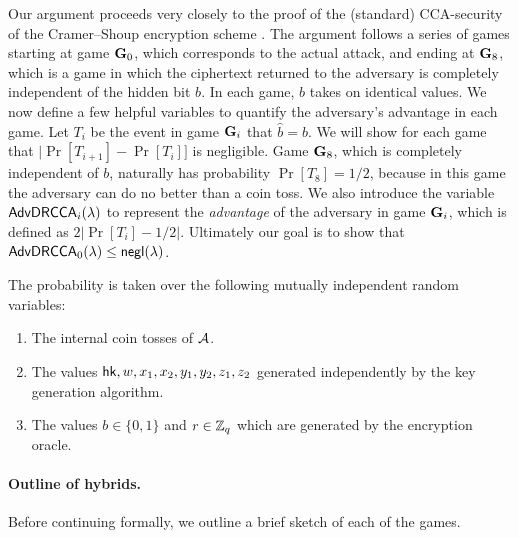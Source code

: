 Our argument proceeds very closely to the proof of the (standard) CCA-security of the Cramer--Shoup encryption scheme \cite[Section~6.2]{cs01}.  The argument follows a series of games starting at game $\mathbf{G}_0$, which corresponds to the actual attack, and ending at $\mathbf{G}_8$, which is a game in which the ciphertext returned to the adversary is completely independent of the hidden bit $b$. In each game, $b$ takes on identical values. We now define a few helpful variables to quantify the adversary's advantage in each game. Let $T_i$ be the event in game $\mathbf{G}_i$ that $\hat{b}=b$. We will show for each game that $|\Pr[T_{i+1}] - \Pr[T_i]]$ is negligible. Game $\mathbf{G}_8$, which is completely independent of $b$, naturally has probability $\Pr[T_8]=1/2$, because in this game the adversary can do no better than a coin toss. We also introduce the variable $\mathsf{AdvDRCCA}_i(\lambda)$ to represent the \textit{advantage} of the adversary in game $\mathbf{G}_i$, which is defined as $2|\Pr[T_i]-1/2|$. Ultimately our goal is to show that $\mathsf{AdvDRCCA}_0(\lambda)\leq\mathsf{negl}(\lambda)$.

The probability is taken over the following mutually independent random variables:	\begin{enumerate}
	\item The internal coin tosses of $\mathcal{A}$.
	\item The values $\mathsf{hk},w,x_1,x_2,y_1,y_2,z_1,z_2$ generated independently by the key generation algorithm.
	\item The values $b\in\{0,1\}$ and $r\in\mathbb{Z}_q$ which are generated by the encryption oracle.
\end{enumerate}

\paragraph{Outline of hybrids.} Before continuing formally, we outline a brief sketch of each of the games.

